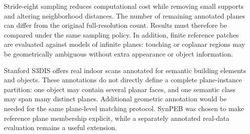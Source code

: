 Stride-eight sampling reduces computational cost while removing small supports and altering neighborhood distances. The number of remaining annotated planes can differ from the original full-resolution count. Results must therefore be compared under the same sampling policy. In addition, finite reference patches are evaluated against models of infinite planes: touching or coplanar regions may be geometrically ambiguous without extra appearance or object information.

Stanford S3DIS \cite{armeni2016s3dis} offers real indoor scans annotated for semantic building elements and objects. These annotations do not directly define a complete plane-instance partition: one object may contain several planar faces, and one semantic class may span many distinct planes. Additional geometric annotation would be needed for the same plane-level matching protocol. SynPEB was chosen to make reference plane membership explicit, while a separately annotated real-data evaluation remains a useful extension.
